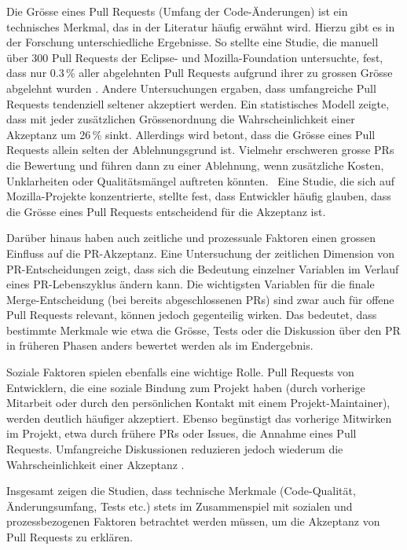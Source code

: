 Die Grösse eines Pull Requests (Umfang der Code-Änderungen) ist ein technisches Merkmal, das in der Literatur häufig erwähnt wird. Hierzu gibt es in der Forschung unterschiedliche Ergebnisse. So stellte eine Studie, die manuell über 300 Pull Requests der Eclipse- und Mozilla-Foundation untersuchte, fest, dass nur 0.3\,\% aller abgelehnten Pull Requests aufgrund ihrer zu grossen Grösse abgelehnt wurden \parencite{tao_writing_2014}. Andere Untersuchungen ergaben, dass umfangreiche Pull Requests tendenziell seltener akzeptiert werden. Ein statistisches Modell zeigte, dass mit jeder zusätzlichen Grössenordnung die Wahrscheinlichkeit einer Akzeptanz um 26\,\% sinkt. Allerdings wird betont, dass die Grösse eines Pull Requests allein selten der Ablehnungsgrund ist. Vielmehr erschweren grosse PRs die Bewertung und führen dann zu einer Ablehnung, wenn zusätzliche Kosten, Unklarheiten oder Qualitätsmängel auftreten könnten. \ Eine Studie, die sich auf Mozilla-Projekte konzentrierte, stellte fest, dass Entwickler häufig glauben, dass die Grösse eines Pull Requests entscheidend für die Akzeptanz ist. \parencite{tsay_influence_2014}

Darüber hinaus haben auch zeitliche und prozessuale Faktoren einen grossen Einfluss auf die PR-Akzeptanz. Eine Untersuchung der zeitlichen Dimension von PR-Entscheidungen zeigt, dass sich die Bedeutung einzelner Variablen im Verlauf eines PR-Lebenszyklus ändern kann. Die wichtigsten Variablen für die finale Merge-Entscheidung (bei bereits abgeschlossenen PRs) sind zwar auch für offene Pull Requests relevant, können jedoch gegenteilig wirken. Das bedeutet, dass bestimmte Merkmale wie etwa die Grösse, Tests oder die Diskussion über den PR in früheren Phasen anders bewertet werden als im Endergebnis. \parencite{west_temporal_2023}

Soziale Faktoren spielen ebenfalls eine wichtige Rolle. Pull Requests von Entwicklern, die eine soziale Bindung zum Projekt haben (durch vorherige Mitarbeit oder durch den persönlichen Kontakt mit einem Projekt-Maintainer), werden deutlich häufiger akzeptiert. Ebenso begünstigt das vorherige Mitwirken im Projekt, etwa durch frühere PRs oder Issues, die Annahme eines Pull Requests. Umfangreiche Diskussionen reduzieren jedoch wiederum die Wahrscheinlichkeit einer Akzeptanz \parencite{tsay_influence_2014}.

Insgesamt zeigen die Studien, dass technische Merkmale (Code-Qualität, Änderungsumfang, Tests etc.) stets im Zusammenspiel mit sozialen und prozessbezogenen Faktoren betrachtet werden müssen, um die Akzeptanz von Pull Requests zu erklären.

